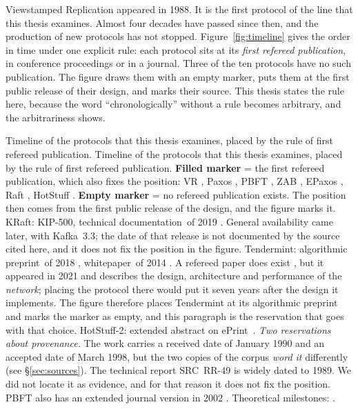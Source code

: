 Viewstamped Replication appeared in 1988. It is the first protocol of the
line that this thesis examines. Almost four decades have passed since
then, and the production of new protocols has not stopped.
Figure~\ref{fig:timeline} gives the order in time under one explicit
rule: each protocol sits at its \emph{first refereed publication}, in
conference proceedings or in a journal. Three of the ten protocols have
no such publication. The figure draws them with an empty marker, puts
them at the first public release of their design, and marks their source.
This thesis states the rule here, because the word
\enquote{chronologically} without a rule becomes arbitrary, and the
arbitrariness shows.

%
{Timeline of the protocols that this thesis examines, placed by the rule
of first refereed publication.}%
{Timeline of the protocols that this thesis examines, placed by the rule
of first refereed publication. \textbf{Filled marker} = the first
refereed publication, which also fixes the position: VR
\cite{oki1988viewstamped}, Paxos \cite{lamport1998parttime}, PBFT
\cite{castro1999pbft}, ZAB \cite{junqueira2011zab}, EPaxos
\cite{moraru2013epaxos}, Raft \cite{ongaro2014raft}, HotStuff
\cite{yin2019hotstuff}. \textbf{Empty marker} = no refereed publication
exists. The position then comes from the first public release of the
design, and the figure marks it. KRaft: KIP-500, technical
documentation\grey\ of 2019 \cite{kafka2019kip500}. General
availability came later, with Kafka~3.3; the date of that release is not
documented by the source cited here, and it does not fix the position in
the figure. Tendermint: algorithmic preprint\prep\ of
2018 \cite{buchman2018gossip}, whitepaper\grey\ of 2014
\cite{kwon2014tendermint}. A refereed paper does exist
\cite{cason2021tendermint}, but it appeared in 2021 and describes the
design, architecture and performance of the \emph{network}; placing the
protocol there would put it seven years after the design it implements.
The figure therefore places Tendermint at its algorithmic preprint and
marks the marker as empty, and this paragraph is the reservation that
goes with that choice. HotStuff-2: extended
abstract on ePrint\prep\ \cite{malkhi2023hotstuff2}. \emph{Two
reservations about provenance.} The work \cite{lamport1998parttime}
carries a received date of January 1990 and an accepted date of March
1998, but the two copies of the corpus \emph{word it} differently (see
\S\ref{sec:sources}). The technical report SRC~RR-49 is widely dated to
1989. We did not locate it as evidence, and for that reason it does not
fix the position. PBFT also has an extended journal version in 2002
\cite{castro2002pbftrecovery}. Theoretical milestones:
\cite{lamport1978time,lamport1982byzantine,fischer1985impossibility,%
dwork1988consensus,schneider1990implementing,herlihy1990linearizability}.}%
{}

